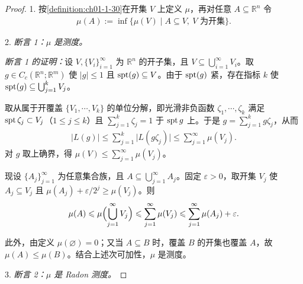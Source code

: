 \documentclass[../../main.tex]{subfiles}%
\begin{document}
\begin{proof}
1. 按\cref{definition:ch01-1-30}在开集 $V$ 上定义 $\mu$，再对任意 $A\subseteq\mathbb{R}^n$ 令%
\begin{align*}
\mu(A):=\inf\{\mu(V)\mid A\subseteq V,\ V\text{ 为开集}\}.
\end{align*}

2. \emph{断言 1：$\mu$ 是测度。}

\emph{断言 1 的证明：}设 $V,\{V_i\}_{i=1}^{\infty}$ 为 $\mathbb{R}^n$ 的开子集，且 $V\subseteq\bigcup_{i=1}^{\infty}V_i$。取 $g\in C_c(\mathbb{R}^n;\mathbb{R}^m)$ 使 $\lvert g\rvert\leqslant1$ 且 $\operatorname{spt}(g)\subseteq V$。由于 $\operatorname{spt}(g)$ 紧，存在指标 $k$ 使 $\operatorname{spt}(g)\subseteq\bigcup_{j=1}^{k}V_j$。

取从属于开覆盖 $\{V_1,\cdots,V_k\}$ 的单位分解，即光滑非负函数 $\zeta_1,\cdots,\zeta_k$ 满足 $\operatorname{spt}\zeta_j\subset V_j$（$1\leqslant j\leqslant k$）且 $\sum_{j=1}^{k}\zeta_j=1$ 于 $\operatorname{spt} g$ 上。于是 $g=\sum_{j=1}^{k}g\zeta_j$，从而
\begin{align*}
\lvert L(g)\rvert\leqslant\sum_{j=1}^{k}\lvert L(g\zeta_j)\rvert\leqslant\sum_{j=1}^{\infty}\mu(V_j).
\end{align*}
对 $g$ 取上确界，得 $\mu(V)\leqslant\sum_{j=1}^{\infty}\mu(V_j)$。

现设 $\{A_j\}_{j=1}^{\infty}$ 为任意集合族，且 $A\subseteq\bigcup_{j=1}^{\infty}A_j$。固定 $\varepsilon>0$，取开集 $V_j$ 使 $A_j\subseteq V_j$ 且 $\mu(A_j)+\varepsilon/2^j\geqslant\mu(V_j)$。则
\begin{align*}
\mu(A)\leqslant\mu\Bigl(\bigcup_{j=1}^{\infty}V_j\Bigr)\leqslant\sum_{j=1}^{\infty}\mu(V_j)\leqslant\sum_{j=1}^{\infty}\mu(A_j)+\varepsilon.
\end{align*}

此外，由定义 $\mu(\varnothing)=0$；又当 $A\subseteq B$ 时，覆盖 $B$ 的开集也覆盖 $A$，故 $\mu(A)\leqslant\mu(B)$。结合上述次可加性，$\mu$ 是测度。

3. \emph{断言 2：$\mu$ 是 Radon 测度。}


\end{proof}
\end{document}
